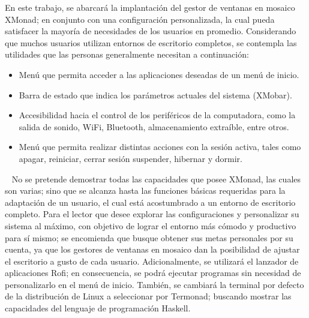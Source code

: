 \normalsize{ \indent
En este trabajo, se abarcará la implantación del
gestor de ventanas en mosaico XMonad; en conjunto con
una configuración personalizada, la cual pueda satisfacer
la mayoría de necesidades de los usuarios en promedio.
Considerando que muchos usuarios utilizan entornos de
escritorio completos, se contempla las utilidades que
las personas generalmente necesitan a continuación:
}
\begin{itemize}
  \item Menú que permita acceder a las aplicaciones
  deseadas de un menú de inicio.
  \item Barra de estado que indica los parámetros
  actuales del sistema (XMobar).
  \item Accesibilidad hacia el control de los
  periféricos de la computadora, como la salida
  de sonido, WiFi, Bluetooth, almacenamiento
  extraíble, entre otros.
  \item Menú que permita realizar distintas
  acciones con la sesión activa, tales como apagar,
  reiniciar, cerrar sesión suspender, hibernar y
  dormir.
\end{itemize}
\ \newline
\normalsize{ \indent
No se pretende demostrar todas las capacidades que
posee XMonad, las cuales son varias; sino que se
alcanza hasta las funciones básicas requeridas para
la adaptación de un usuario, el cual está acostumbrado
a un entorno de escritorio completo.
}
\newline
\normalsize{ \indent
Para el lector que desee explorar las configuraciones
y personalizar su sistema al máximo, con objetivo de
lograr el entorno más cómodo y productivo para sí
mismo; se encomienda que busque obtener sus metas
personales por su cuenta, ya que los gestores de
ventanas en mosaico dan la posibilidad de ajustar el
escritorio a gusto de cada usuario.
}
\newline
\normalsize{ \indent
Adicionalmente, se utilizará el lanzador de aplicaciones
Rofi; en consecuencia, se podrá ejecutar programas sin
necesidad de personalizarlo en el menú de inicio. También,
se cambiará la terminal por defecto de la distribución
de Linux a seleccionar por Termonad; buscando mostrar las
capacidades del lenguaje de programación Haskell.
}
